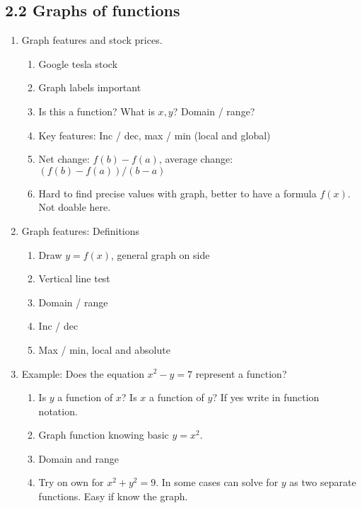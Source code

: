 \documentclass{article}
\begin{document}
\subsection{2.2 Graphs of functions}
\begin{enumerate}

\item Graph features and stock prices.
\begin{enumerate}
\item Google tesla stock
\item Graph labels important
\item Is this a function? What is $x, y$? Domain / range?
\item Key features: Inc / dec, max / min (local and global)
\item Net change: $f(b)-f(a)$, average change: $(f(b)-f(a))/(b-a)$
\item Hard to find precise values with graph, better to have a formula $f(x)$. Not doable here. 
\end{enumerate}

\item Graph features: Definitions
\begin{enumerate}
\item Draw $y=f(x)$, general graph on side
\item Vertical line test
\item Domain / range
\item Inc / dec
\item Max / min, local and absolute
\end{enumerate}

\item Example: Does the equation $x^2-y=7$ represent a function?
\begin{enumerate}
\item Is $y$ a function of $x$? Is $x$ a function of $y$? If yes write in function notation.
\item Graph function knowing basic $y=x^2$.
\item Domain and range
\item Try on own for $x^2+y^2=9$. In some cases can solve for $y$ as two separate functions. Easy if know the graph.
\end{enumerate}


\end{enumerate}
\end{document}

